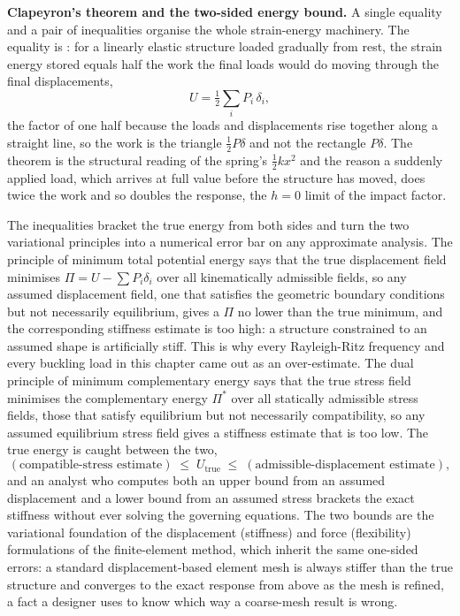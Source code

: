 \begin{mastery}
\textbf{Clapeyron's theorem and the two-sided energy bound.} A single
equality and a pair of inequalities organise the whole strain-energy
machinery. The equality is : for a linearly
elastic structure loaded gradually from rest, the strain energy stored
equals half the work the final loads would do moving through the final
displacements,
\[
U = \tfrac12\sum_i P_i\,\delta_i,
\]
the factor of one half because the loads and displacements rise together
along a straight line, so the work is the triangle $\tfrac12 P\delta$ and
not the rectangle $P\delta$. The theorem is the structural reading of the
spring's $\tfrac12 k x^2$ and the reason a suddenly applied load, which
arrives at full value before the structure has moved, does twice the work
and so doubles the response, the $h=0$ limit of the impact factor.

The inequalities bracket the true energy from both sides and turn the two
variational principles into a numerical error bar on any approximate
analysis. The principle of minimum total potential energy says that the
true displacement field minimises $\Pi = U - \sum P_i\delta_i$ over all
kinematically admissible fields, so any assumed displacement field, one
that satisfies the geometric boundary conditions but not necessarily
equilibrium, gives a $\Pi$ no lower than the true minimum, and the
corresponding stiffness estimate is too high: a structure constrained to an
assumed shape is artificially stiff. This is why every Rayleigh-Ritz
frequency and every buckling load in this chapter came out as an
over-estimate. The dual principle of minimum complementary energy says that
the true stress field minimises the complementary energy $\Pi^*$ over all
statically admissible stress fields, those that satisfy equilibrium but not
necessarily compatibility, so any assumed equilibrium stress field gives a
stiffness estimate that is too low. The true energy is caught between the
two,
\[
(\text{compatible-stress estimate}) \;\le\;
U_{\text{true}} \;\le\;
(\text{admissible-displacement estimate}),
\]
and an analyst who computes both an upper bound from an assumed displacement
and a lower bound from an assumed stress brackets the exact stiffness without
ever solving the governing equations. The two bounds are the variational
foundation of the displacement (stiffness) and force (flexibility)
formulations of the finite-element method, which inherit the same one-sided
errors: a standard displacement-based element mesh is always stiffer than the
true structure and converges to the exact response from above as the mesh is
refined, a fact a designer uses to know which way a coarse-mesh result is
wrong.
\end{mastery}

